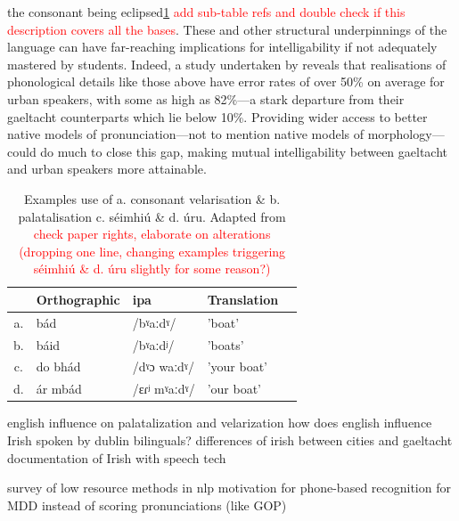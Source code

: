 \documentclass[thesis]{cluu}
\newcommand{\todo}[1]{\textcolor{red}{#1}}
\newcommand{\ipa}[1]{{\ipafont #1}}
\begin{document}
the consonant being eclipsed\ref{tab:sound_contrasts} \todo{add sub-table refs and double check if this description covers all the bases}. These and other structural underpinnings of the language can have far-reaching implications for intelligability if not adequately mastered by students. Indeed, a study undertaken by \textcite{broinNewUrbanIrish2014} reveals that realisations of phonological details like those above have error rates of over 50\% on average for urban speakers, with some as high as 82\%---a stark departure from their gaeltacht counterparts which lie below 10\%. Providing wider access to better native models of pronunciation---not to mention native models of morphology---could do much to close this gap, making mutual intelligability between gaeltacht and urban speakers more attainable. 

\begin{table}[ht]
  \centering
  \caption{Examples use of a. consonant velarisation \& b. palatalisation c. séimhiú \& d. úru. Adapted from \textcite{nichasaideSPEECHTECHNOLOGYDOCUMENTATION2015} \todo{check paper rights, elaborate on alterations (dropping one line, changing examples triggering séimhiú \& d. úru slightly for some reason?)}}
  \begin{tabular}{c|l|l|l|l}
     & Orthographic & \gls{ipa} & Translation \\
    \hline
    a. & bád & /\ipa{bˠaːdˠ}/ & 'boat' \\
    b. & báid & /\ipa{bˠaːdʲ}/ & 'boats' \\
    c. & do bhád & /\ipa{dˠɔ waːdˠ}/ & 'your boat'\\
    d. & ár mbád & /\ipa{ɛɾʲ mˠaːdˠ}/ & 'our boat'\\
  \end{tabular}
  \label{tab:sound_contrasts}
\end{table}

\textcite{gabrieleEnglishInfluenceL2} english influence on palatalization and velarization
\textcite{snesarevaPalatalizationDublinIrish2016} how does english influence Irish spoken by dublin bilinguals?
\textcite{broinNewUrbanIrish2014} differences of irish between cities and gaeltacht
\textcite{nichasaideSPEECHTECHNOLOGYDOCUMENTATION2015} documentation of Irish with speech tech

\textcite{magueresseLowresourceLanguagesReview2020} survey of low resource methods in \gls{nlp}
\textcite{wuTransformerBasedEndtoEnd2021} motivation for phone-based recognition for MDD instead of scoring pronunciations (like GOP)
\end{document}
